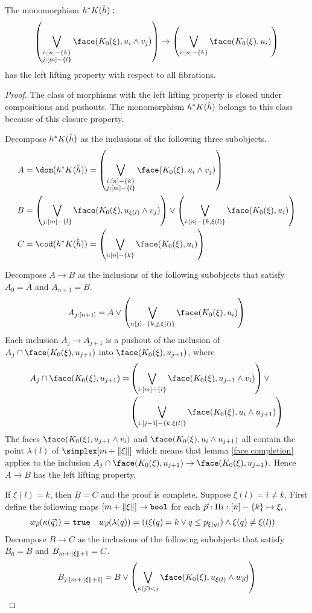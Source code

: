 \documentclass[csh.tex]{subfiles}
\begin{document}
\begin{lemma} The monomorphism $h^* K(\hat h):$
\[ \left(\bigvee_{\substack{i\of[n]-\set{k}\\j\of [m]-\set l}}\face(K_0(\xi),u_i\land v_j)\right)\to\left(\bigvee_{i\of[n]-\set{k}} \face(K_0(\xi),u_i)\right) \] 
has the left lifting property with respect to all fibrations.\label{left lifting property}\end{lemma}

\begin{proof}The class of morphisms with the left lifting property is closed under compositions and pushouts. The monomorphism $h^* K(\hat h)$ belongs to this class because of this closure property.

Decompose $h^* K(\hat h)$ as the inclusions of the following three subobjects.
\begin{align*}
A &=\dom(h\ri K(\hat h))=\left(\bigvee_{\substack{i\of[n]-\set{k}\\j\of [m]-\set l}}\face(K_0(\xi),u_i\land v_j)\right)\\
B &=\left(\bigvee_{j\of[m]-\set l}\face(K_0(\xi),u_{\xi(l)}\land v_j)\right)\vee \left(\bigvee_{i\of[n]-\set{k,\xi(l)}}\face(K_0(\xi),u_i)\right)\\
C &=\cod(h\ri K(\hat h))=\left(\bigvee_{i\of[n]-\set{k}} \face(K_0(\xi),u_i)\right)
\end{align*}

Decompose $A\to B$ as the inclusions of the following subobjects that satisfy $A_0=A$ and $A_{n+1}=B$.
\[ A_{j\of[n+1]} = A\vee \left(\bigvee_{i\of[j]-\set{k,j,\xi(l)}}\face(K_0(\xi),u_i)\right) \]
Each inclusion $A_j\to A_{j+1}$ is a pushout of the inclusion of $A_j\cap \face(K_0(\xi),u_{j+1})$ into $\face(K_0(\xi),u_{j+1})$, where
\begin{align*} A_j\cap \face(K_0(\xi),u_{j+1}) = &\left(\bigvee_{i\of[m]-\set l}\face(K_0(\xi),u_{j+1}\land v_{i})\right)\vee \\
&\left(\bigvee_{i\of[j+1]-\set{k,\xi(l)}}\face(K_0(\xi),u_i\land u_{j+1})\right)\end{align*}
The faces $\face(K_0(\xi),u_{j+1}\land v_{i})$ and $\face(K_0(\xi),u_i\land u_{j+1})$ all contain the point $\lambda(l)$ of $\simplex[m+\norm\xi]$ which means that lemma \ref{face completion} applies to the inclusion $A_j\cap \face(K_0(\xi),u_{j+1}) \to \face(K_0(\xi),u_{j+1})$. Hence $A\to B$ has the left lifting property.

If $\xi(l)=k$, then $B=C$ and the proof is complete. Suppose $\xi(l)=i\neq k$. First define the following maps $[m+\Vert \xi \Vert]\to\mathtt{bool}$ for each $\vec p :\Pi i: [n]-\left\{k\right\} \mapsto \xi_i$.
\begin{align*}
w_{\vec p}(\kappa(\vec q)) &= \mathtt{true} &
w_{\vec p}(\lambda(q)) &= ((\xi(q)=k\vee q\leq p_{\xi(q)})\land\xi(q)\neq \xi(l))
\end{align*}
Decompose $B\to C$ as the inclusions of the following subobjects that satisfy $B_0=B$ and $B_{m+\Vert \xi \Vert+1}=C$.
\[ B_{j\of[m+\norm\xi+1]} = B \vee \left(\bigvee_{\kappa(\vec p)<j} \face(K_0(\xi),u_{\xi(l)}\land w_{\vec p})\right)\]


\end{proof}
\end{document}
